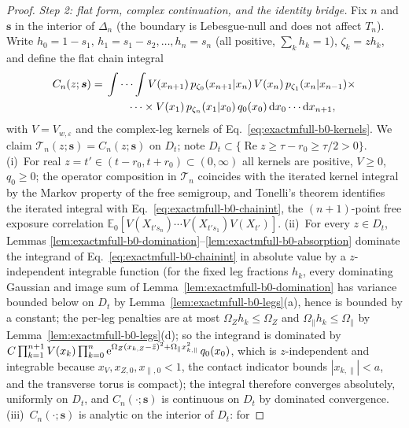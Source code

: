 \begin{proof}
\emph{Step 2: flat form, complex continuation, and the identity bridge.}
Fix \(n\) and \(\bm s\) in the interior of \(\Delta_n\) (the boundary is
Lebesgue-null and does not affect \(T_n\)).  Write
\(h_0=1-s_1,\,h_1=s_1-s_2,\ldots,h_n=s_n\) (all positive,
\(\sum_kh_k=1\)), \(\zeta_k=zh_k\), and define the flat chain integral
\begin{equation}
 \begin{split}
 C_n(z;\bm s)
 ={}&\idotsint
 V(x_{n+1})\,p_{\zeta_0}(x_{n+1}|x_n)\,V(x_n)\,
 p_{\zeta_1}(x_n|x_{n-1})\times\\
 &\qquad\cdots\times V(x_1)\,
 p_{\zeta_n}(x_1|x_0)\,q_0(x_0)\,
 \mathrm d x_0\cdots\mathrm d x_{n+1},
 \end{split}
 \label{eq:exactmfull-b0-chainint}
\end{equation}
with \(V=V_{w,\varepsilon}\) and the complex-leg kernels of
Eq.~\eqref{eq:exactmfull-b0-kernels}.  We claim
\(\mathcal T_n(z;\bm s)=C_n(z;\bm s)\) on \(D_t\); note
\(D_t\subset\{\operatorname{Re}z\ge\tau-r_0\ge\tau/2>0\}\).
(i)~For real \(z=t'\in(t-r_0,t+r_0)\subset(0,\infty)\) all kernels are
positive, \(V\ge0\), \(q_0\ge0\); the operator composition in
\(\mathcal T_n\) coincides with the iterated kernel integral by the Markov
property of the free semigroup, and Tonelli's theorem identifies the
iterated integral with Eq.~\eqref{eq:exactmfull-b0-chainint}, the
\((n+1)\)-point free exposure correlation
\(\mathbb E_0[V(X_{t's_n})\cdots V(X_{t's_1})V(X_{t'})]\).
(ii)~For every \(z\in D_t\), Lemmas
\ref{lem:exactmfull-b0-domination}--\ref{lem:exactmfull-b0-absorption}
dominate the integrand of Eq.~\eqref{eq:exactmfull-b0-chainint} in absolute
value by a \(z\)-independent integrable function (for the fixed leg
fractions \(h_k\), every dominating Gaussian and image sum of
Lemma~\ref{lem:exactmfull-b0-domination} has variance bounded below on
\(D_t\) by Lemma~\ref{lem:exactmfull-b0-legs}(a), hence is bounded by a
constant; the per-leg penalties are at most \(\Omega_Zh_k\le\Omega_Z\) and
\(\Omega_\parallel h_k\le\Omega_\parallel\) by
Lemma~\ref{lem:exactmfull-b0-legs}(d); so the integrand is dominated by
\(C\prod_{k=1}^{n+1}V(x_k)\prod_{k=0}^{n}\mathrm e^{\Omega_Z(x_{k,Z}-\bar z)^2
+\Omega_\parallel x_{k,\parallel}^2}\,q_0(x_0)\), which is
\(z\)-independent and integrable because
\(x_V,x_{Z,0},x_{\parallel,0}<1\), the contact indicator bounds
\(|x_{k,\parallel}|<a\), and the transverse torus is compact); the integral
therefore converges absolutely, uniformly on
\(D_t\), and \(C_n(\cdot;\bm s)\) is continuous on \(D_t\) by dominated
convergence.
(iii)~\(C_n(\cdot;\bm s)\) is analytic on the interior of \(D_t\): for

\end{proof}
